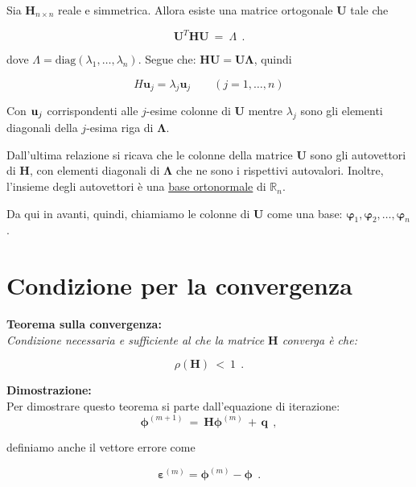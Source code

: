 Sia $\mathbf H_{n\times n}$ reale e simmetrica. Allora esiste una matrice ortogonale $\mathbf U$ tale che

\begin{equation*}
	\mathbf U^T\mathbf H\mathbf U\ =\ \Lambda\ \ .
\end{equation*}

dove $\Lambda = \text{diag}(\lambda_1, \dots, \lambda_n)$. Segue che: $\mathbf H \mathbf U = \mathbf U \mathbf \Lambda$, quindi

\begin{equation*}
	H \boldsymbol{u}_j = \lambda_j \boldsymbol{u}_j
	\qquad (j=1,\dots, n)
\end{equation*}

Con $\textbf u_j$ corrispondenti alle $j$-esime colonne di $\mathbf U$ mentre $\lambda_j$ sono gli elementi diagonali della $j$-esima riga di $\mathbf \Lambda$. 

Dall'ultima relazione si ricava che le colonne della matrice $\mathbf U$ sono gli autovettori di $\mathbf H$, con elementi diagonali di $\mathbf \Lambda$ che ne sono i rispettivi autovalori. Inoltre, l'insieme degli autovettori è una \underline{base ortonormale} di $\mathbb{R}_n$.

Da qui in avanti, quindi, chiamiamo le colonne di $\mathbf U$ come una base: $\boldsymbol{\varphi}_1, \boldsymbol{\varphi}_2,\dots, \boldsymbol{\varphi}_n$.

\section{Condizione per la convergenza}

\textbf{Teorema sulla convergenza: }\\
\emph{Condizione necessaria e sufficiente al che la matrice $\mathbf H$ converga è che: }

\[\rho(\mathbf H)\ <\ 1\ \ .\]

\textbf{Dimostrazione:}\\
Per dimostrare questo teorema si parte dall'equazione di iterazione:
\[\mathbf \phi^{(m+1)}\ =\ \mathbf H \mathbf \phi^{(m)}\, +\, \mathbf q\ \ ,\]

definiamo anche il vettore errore come

\begin{equation*}
	\boldsymbol{\varepsilon}^{(m)} = \boldsymbol{\phi}^{(m)} - \boldsymbol{\phi}\ \ .
\end{equation*}

